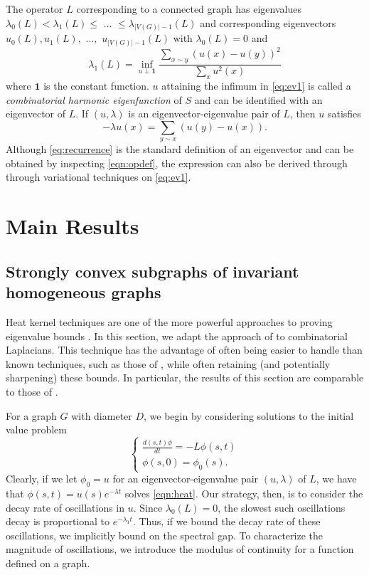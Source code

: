 The operator $L$ corresponding to a connected graph has eigenvalues $\lambda_0(L) < \lambda_1(L) \leq$ $\dots$ $\leq \lambda_{|V(G)|-1}(L)$ and corresponding eigenvectors $u_0(L),u_1(L) ,$ $ \dots, $ $ u_{|V(G)|-1}(L)$ with $\lambda_0(L)=0$ and
\begin{equation}\label{eq:ev1}
	\lambda_1(L) = \inf_{u \perp \mathbf{1}} \frac{\displaystyle\sum_{x\sim y}\left(u(x)-u(y)\right)^2}{\displaystyle \sum_x u^2(x)}
\end{equation}
where $\mathbf{1}$ is the constant function. $u$ attaining the infimum in \cref{eq:ev1} is called a \textit{combinatorial harmonic eigenfunction} of $S$ and can be identified with an eigenvector of $L$. If $(u,\lambda)$ is an eigenvector-eigenvalue pair of $L$, then $u$ satisfies
\begin{equation}\label{eq:recurrence}
-\lambda u(x) = \sum_{y \sim x} \left( u(y) - u(x) \right).
\end{equation}
Although \cref{eq:recurrence} is the standard definition of an eigenvector and can be obtained by inspecting \cref{eqn:opdef}, the expression can also be derived through through variational techniques on \cref{eq:ev1}\cite{Chung}. 

\section{Main Results}
\subsection{Strongly convex subgraphs of invariant homogeneous graphs}\label{sec:homogeneous1}
Heat kernel techniques are one of the more powerful approaches to proving eigenvalue bounds \cite{Chung}. In this section, we adapt the approach of \cite{andrews2014moduli} to combinatorial Laplacians. This technique has the advantage of often being easier to handle than known techniques, such as those of \cite{Banuelos2000,Chung,Chung2014,Chung1994,Chung2000}, while often retaining (and potentially sharpening) these bounds. In particular, the results of this section are comparable to those of \cite{Chung1994}.

For a graph $G$ with diameter $D$, we begin by considering solutions to the initial value problem
\begin{equation}\label{eqn:heat}
    \begin{cases}
    	\frac{d(s,t)\phi}{dt} = - L \phi(s,t) \\
    	\phi(s,0) = \phi_0(s).
    \end{cases}
\end{equation}
Clearly, if we let $\phi_0=u$ for an eigenvector-eigenvalue pair $(u,\lambda)$ of $L$, we have that $\phi(s,t) = u(s) e^{-\lambda t}$ solves \cref{eqn:heat}. Our strategy, then, is to consider the decay rate of oscillations in $u$. Since $\lambda_0(L)=0$, the slowest such oscillations decay is proportional to $e^{-\lambda_1 t}$. Thus, if we bound the decay rate of these oscillations, we implicitly bound on the spectral gap. To characterize the magnitude of oscillations, we introduce the modulus of continuity for a function defined on a graph.

